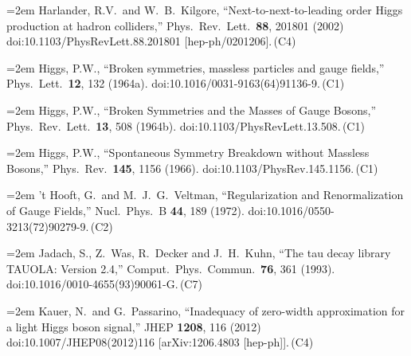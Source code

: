 \documentclass[letter,12pt]{article}
\def\xbibitem#1#2#3{\noindent\hangindent=2em #2\,(#3)}
\begin{document}
\xbibitem{Harlander:2002wh}{Harlander, R.V.\ and W.~B.~Kilgore,
  ``Next-to-next-to-leading order Higgs production at hadron colliders,''
  Phys.\ Rev.\ Lett.\  {\bf 88}, 201801 (2002)
  doi:10.1103/PhysRevLett.88.201801
  [hep-ph/0201206].}{C4}

\xbibitem{Higgs:1964ia}{Higgs, P.W.,
  ``Broken symmetries, massless particles and gauge fields,''
  Phys.\ Lett.\  {\bf 12}, 132 (1964a).
  doi:10.1016/0031-9163(64)91136-9.}{C1}
 
\xbibitem{Higgs:1964pj}{Higgs, P.W.,
  ``Broken Symmetries and the Masses of Gauge Bosons,''
  Phys.\ Rev.\ Lett.\  {\bf 13}, 508 (1964b).
  doi:10.1103/PhysRevLett.13.508.}{C1}

\xbibitem{Higgs:1966ev}{Higgs, P.W.,
  ``Spontaneous Symmetry Breakdown without Massless Bosons,''
  Phys.\ Rev.\  {\bf 145}, 1156 (1966).
  doi:10.1103/PhysRev.145.1156.}{C1}

\xbibitem{'tHooft:1972fi}{'t Hooft, G.\ and M.~J.~G.~Veltman, 
  ``Regularization and Renormalization of Gauge Fields,''
  Nucl.\ Phys.\ B {\bf 44}, 189 (1972).
  doi:10.1016/0550-3213(72)90279-9.}{C2}

\xbibitem{Jadach:1993hs}{Jadach, S., Z.~Was, R.~Decker and J.~H.~Kuhn,
  ``The tau decay library TAUOLA: Version 2.4,''
  Comput.\ Phys.\ Commun.\  {\bf 76}, 361 (1993).
  doi:10.1016/0010-4655(93)90061-G.}{C7}

\xbibitem{Kauer:2012hd}{Kauer, N.\ and G.~Passarino,
  ``Inadequacy of zero-width approximation for a light Higgs boson signal,''
  JHEP {\bf 1208}, 116 (2012)
  doi:10.1007/JHEP08(2012)116
  [arXiv:1206.4803 [hep-ph]].}{C4}
\end{document}
